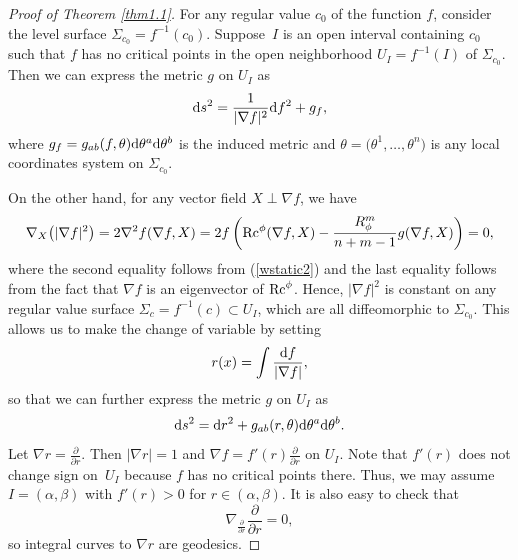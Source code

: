 \documentclass[10pt,a4paper]{amsart}
\numberwithin{equation}{section}
\begin{document}
\begin{proof}[Proof of Theorem \ref{thm1.1}]
For any regular value $c_0$ of the function $f$, consider the level surface $\Sigma_{c_0}=f^{-1}(c_0)$. Suppose~$I$ is an open interval containing $c_0$ such that $f$ has no critical points in the open neighborhood $U_I=f^{-1}(I)$ of $\Sigma_{c_0}$. Then we can express the metric $g$ on $U_I$ as
\begin{equation*}
 {\rm d}s^2=\frac{1}{|\nabla f|^2}{\rm d}f^2+g_{f},
\end{equation*}
where $g_{f}=g_{ab}(f,\theta){\rm d}\theta^a{\rm d}\theta^b$ is the induced metric and $\theta=\bigl(\theta^1,\dots,\theta^n\bigr)$ is any local coordinates system on $\Sigma_{c_0}$.

On the other hand, for any vector field $X\perp \nabla f$, we have
\begin{equation*}
 \nabla_X\bigl(|\nabla f|^2\bigr)=2\nabla^2f(\nabla f,X)=2f\left({\rm Rc}^\phi(\nabla f,X)-\frac{R_\phi^m}{n+m-1}g(\nabla f,X)\right)=0,
\end{equation*}
where the second equality follows from (\ref{wstatic2})
and the last equality follows from the fact that $\nabla f$ is an eigenvector of ${\rm Rc}^\phi$. Hence, $|\nabla f|^2$ is constant on any regular value surface $\Sigma_c=f^{-1}(c)\subset U_I$, which are all diffeomorphic to $\Sigma_{c_0}$. This allows us to make the change of variable by setting
\begin{equation*}
 r(x)=\int \frac{{\rm d}f}{|\nabla f|},
\end{equation*}
so that we can further express the metric $g$ on $U_I$ as
\begin{equation*}
 {\rm d}s^2={\rm d}r^2+g_{ab}(r,\theta){\rm d}\theta^a{\rm d}\theta^b.
\end{equation*}
Let $\nabla r=\frac{\partial}{\partial r}$. Then $|\nabla r|=1$ and $\nabla f=f'(r) \frac{\partial }{\partial r}$ on $U_I$. Note that $f'(r)$ does not change sign on~$U_I$ because $f$ has no critical points there. Thus, we may assume $I=(\alpha,\beta)$ with $f'(r)>0$ for $r\in (\alpha,\beta)$. It is also easy to check that
\begin{equation}\label{cao2.4}
 \nabla_{\frac{\partial}{\partial r}}\frac{\partial}{\partial r}=0,
\end{equation}
so integral curves to $\nabla r$ are geodesics.


\end{proof}
\end{document}
